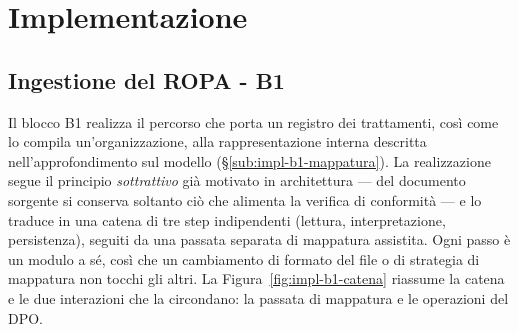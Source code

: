 \chapter{Implementazione}
\label{cap:implementazione}

\section{Ingestione del ROPA - B1}
\label{sec:impl-b1-ingestione}

Il blocco B1 realizza il percorso che porta un registro dei trattamenti, così come lo compila un'organizzazione, alla rappresentazione interna descritta nell'approfondimento sul modello (§\ref{sub:impl-b1-mappatura}). La realizzazione segue il principio \emph{sottrattivo} già motivato in architettura --- del documento sorgente si conserva soltanto ciò che alimenta la verifica di conformità --- e lo traduce in una catena di tre step indipendenti (lettura, interpretazione, persistenza), seguiti da una passata separata di mappatura assistita. Ogni passo è un modulo a sé, così che un cambiamento di formato del file o di strategia di mappatura non tocchi gli altri. La Figura~\ref{fig:impl-b1-catena} riassume la catena e le due interazioni che la circondano: la passata di mappatura e le operazioni del DPO.

